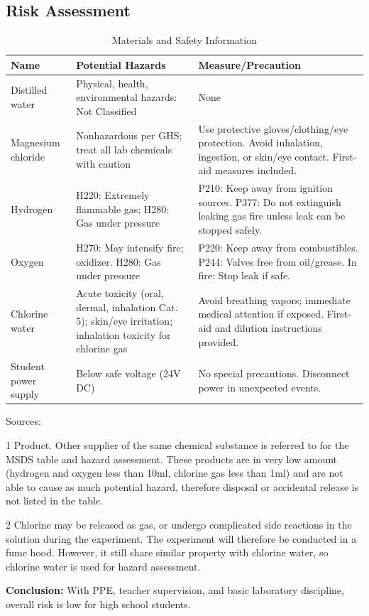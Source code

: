 \documentclass[a4paper]{article}
\begin{document}
\subsection{Risk Assessment}
\begin{table}[htbp]
\centering
\begin{threeparttable}
\caption{Materials and Safety Information}
\begin{tabular}{p{1.8cm}p{5cm}p{6cm}}
\hline
\textbf{Name} & \textbf{Potential Hazards} & \textbf{Measure/Precaution} \\
\hline
Distilled water & Physical, health, environmental hazards: Not Classified & None \\
Magnesium chloride & Nonhazardous per GHS; treat all lab chemicals with caution & Use protective gloves/clothing/eye protection. Avoid inhalation, ingestion, or skin/eye contact. First-aid measures included. \\
Hydrogen \tnote{1} & H220: Extremely flammable gas; H280: Gas under pressure & P210: Keep away from ignition sources. P377: Do not extinguish leaking gas fire unless leak can be stopped safely. \\
Oxygen \tnote{1} & H270: May intensify fire; oxidizer. H280: Gas under pressure & P220: Keep away from combustibles. P244: Valves free from oil/grease. In fire: Stop leak if safe. \\
Chlorine water \tnote{1,2} & Acute toxicity (oral, dermal, inhalation Cat. 5); skin/eye irritation; inhalation toxicity for chlorine gas & Avoid breathing vapors; immediate medical attention if exposed. First-aid and dilution instructions provided. \\
Student power supply & Below safe voltage (24V DC) & No special precautions. Disconnect power in unexpected events. \\
\hline
\end{tabular}
\begin{tablenotes}
\item Sources: \cite{distilledwater_chemicalsUK,magnesiumchloride_flinn2014,oxygen_linde2022,hydrogen_chemicalbook2025,chlorinewater_flinn2014}
\item[1] Product. Other supplier of the same chemical substance is referred to for the MSDS table and hazard assessment. These products are in very low amount (hydrogen and oxygen less than 10ml, chlorine gas less than 1ml) and are not able to cause as much potential hazard, therefore disposal or accidental release is not listed in the table. 
\item[2] Chlorine may be released as gas, or undergo complicated side reactions in the solution during the experiment. The experiment will therefore be conducted in a fume hood. However, it still share similar property with chlorine water, so chlorine water is used for hazard assessment. 
\end{tablenotes}
\end{threeparttable}
\end{table}
\noindent \textbf{Conclusion:} With PPE, teacher supervision, and basic laboratory discipline, overall risk is low for high school students.
\end{document}
